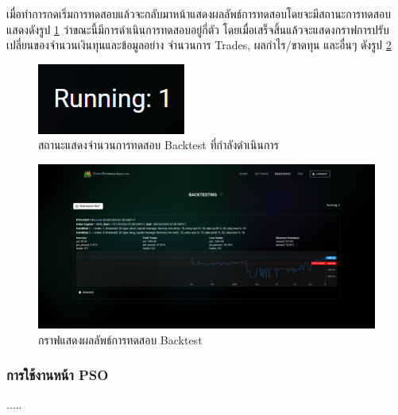 \FloatBarrier
เมื่อทำการกดเริ่มการทดสอบแล้วจะกลับมาหน้าแสดงผลลัพธ์การทดสอบโดยจะมีสถานะการทดสอบแสดงดังรูป \ref{fig:backtest-running} ว่าขณะนี้มีการดำเนินการทดสอบอยู่กี่ตัว โดยเมื่อเสร็จสิ้นแล้วจะแสดงกราฟการปรับเปลี่ยนของจำนวนเงินทุนและข้อมูลอย่าง จำนวนการ Trades, ผลกำไร/ขาดทุน และอื่นๆ ดังรูป \ref{fig:backtest-with-result}
\begin{figure}[ht]
    \centering
    \includegraphics[scale=0.75]{images/web-tuts/backtest-running.PNG}
    \caption{สถานะแสดงจำนวนการทดสอบ Backtest ที่กำลังดำเนินการ}
    \label{fig:backtest-running}
\end{figure}
\begin{figure}[ht]
    \centering
    \includegraphics[width=\textwidth]{images/web-tuts/backtest-with-result.PNG}
    \caption{กราฟแสดงผลลัพธ์การทดสอบ Backtest}
    \label{fig:backtest-with-result}
\end{figure}
\FloatBarrier

\subsubsection{การใช้งานหน้า PSO}
.....